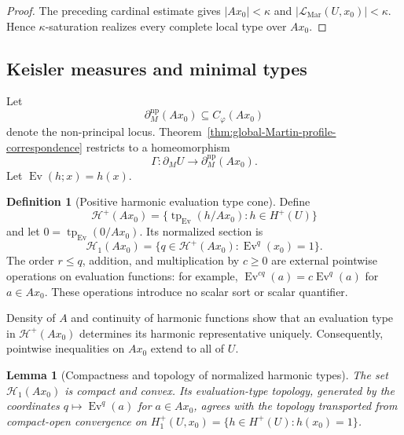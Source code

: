 \documentclass{amsart}
\newtheorem{lemma}[theorem]{Lemma}
\theoremstyle{definition}
\newtheorem{definition}{Definition}[section]
\theoremstyle{remark}
\numberwithin{equation}{section}
\begin{document}
\begin{proof}
	The preceding cardinal estimate gives $|Ax_0|<\kappa$ and
	$|\mathcal L_{\mathrm{Mar}}(U,x_0)|<\kappa$. Hence
	$\kappa$-saturation realizes every complete local type over $Ax_0$.
\end{proof}






\subsection{Keisler measures and minimal types}

Let
$$
\partial_M^{\mathrm{np}}(Ax_0)\subseteq C_\varphi(Ax_0)
$$
denote the non-principal locus. Theorem~\ref{thm:global-Martin-profile-correspondence}
restricts to a homeomorphism
$$
\Gamma:\partial_MU\to\partial_M^{\mathrm{np}}(Ax_0).
$$
Let $\operatorname{Ev}(h;x)=h(x)$.

\begin{definition}[Positive harmonic evaluation type cone]
\label{def:positive-harmonic-evaluation-cone}
Define
$$\mathscr H^+(Ax_0)=\{\operatorname{tp}_{\operatorname{Ev}}(h/Ax_0):h\in H^+(U)\}$$
and let $0=\operatorname{tp}_{\operatorname{Ev}}(0/Ax_0)$. Its normalized section is
$$\mathscr H_1(Ax_0)=\{q\in\mathscr H^+(Ax_0):\operatorname{Ev}^q(x_0)=1\}.$$
The order $r\le q$, addition, and multiplication by $c\ge0$ are external pointwise operations on evaluation functions: for example, $\operatorname{Ev}^{cq}(a)=c\operatorname{Ev}^q(a)$ for $a\in Ax_0$. These operations introduce no scalar sort or scalar quantifier.
\end{definition}

Density of $A$ and continuity of harmonic functions show that an evaluation type in $\mathscr H^+(Ax_0)$ determines its harmonic representative uniquely. Consequently, pointwise inequalities on $Ax_0$ extend to all of $U$.

\begin{lemma}[Compactness and topology of normalized harmonic types]
\label{lem:compact-convex-harmonic-profiles}
The set $\mathscr H_1(Ax_0)$ is compact and convex. Its evaluation-type topology, generated by the coordinates $q\mapsto\operatorname{Ev}^q(a)$ for $a\in Ax_0$, agrees with the topology transported from compact-open convergence on $H_1^+(U,x_0)=\{h\in H^+(U):h(x_0)=1\}$.
\end{lemma}
\end{document}
